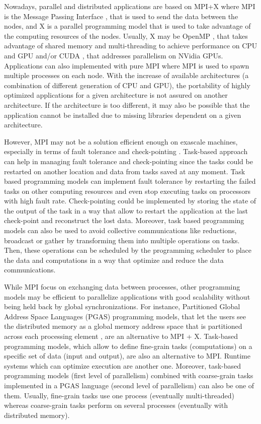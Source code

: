 Nowadays, parallel and distributed applications are based on MPI+X where MPI is the Message Passing Interface \cite{MPIForum}, that is used to send the data between the nodes, and X is a parallel programming model that is used to take advantage of the computing resources of the nodes.
Usually, X may be OpenMP \cite{DaguM1998}, that takes advantage of shared memory and multi-threading to achieve performance on CPU and GPU and/or CUDA \cite{Shane2012}, that addresses parallelism on NVidia GPUs.
Applications can also implemented with pure MPI where MPI is used to spawn multiple processes on each node.
With the increase of available architectures (a combination of different generation of CPU and GPU), the portability of highly optimized applications for a given architecture is not assured on another architecture.
If the architecture is too different, it may also be possible that the application cannot be installed due to missing libraries dependent on a given architecture.

However, MPI may not be a solution efficient enough on exascale machines, especially in terms of fault tolerance and check-pointing \cite{SWAAB2014}.
Task-based approach can help in managing fault tolerance and check-pointing since the tasks could be restarted on another location and data from tasks saved at any moment.
Task based programming models can implement fault tolerance by restarting the failed tasks on other computing resources and even stop executing tasks on processors with high fault rate.
Check-pointing could be implemented by storing the state of the output of the task in a way that allow to restart the application at the last check-point and reconstruct the lost data.
Moreover, task based programming models can also be used to avoid collective communications like reductions, broadcast or gather by transforming them into multiple operations on tasks.
Then, these operations can be scheduled by the programming scheduler to place the data and computations in a way that optimize and reduce the data communications.

While MPI focus on exchanging data between processes, other programming models may be efficient to parallelize applications with good scalability without being held back by global synchronizations.
For instance, Partitioned Global Address Space Languages (PGAS) programming models, that let the users see the distributed memory as a global memory address space that is partitioned across each processing element \cite{CDMCE2005}, are an alternative to MPI + X.
Task-based programming models, which allow to define fine-grain tasks (computations) on a specific set of data (input and output), are also an alternative to MPI.
Runtime systems which can optimize execution are another one.
Moreover, task-based programming models (first level of parallelism) combined with coarse-grain tasks implemented in a PGAS language (second level of parallelism) can also be one of them.
Usually, fine-grain tasks use one process (eventually multi-threaded) whereas coarse-grain tasks perform on several processes (eventually with distributed memory).

